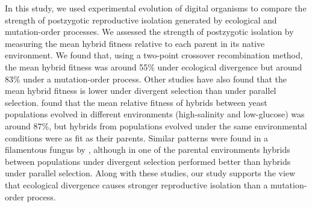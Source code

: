 \begin{doublespace}








In this study, we used experimental evolution of digital organisms
to compare the strength of postzygotic reproductive isolation
generated by ecological and mutation-order processes.
%
We assessed the strength of postzygotic isolation
by measuring the mean hybrid fitness relative to each parent
in its native environment.
%
We found that, using a two-point crossover recombination method,
the mean hybrid fitness was around 55\% under ecological divergence
but around 83\% under a mutation-order process.
%
Other studies have also found that the mean hybrid fitness
is lower under divergent selection than under parallel selection.
%
\citet{det07} found that the mean relative fitness of hybrids
between yeast populations evolved in different environments
(high-salinity and low-glucose) was around 87\%,
but hybrids from populations evolved
under the same environmental conditions were as fit as their parents.
%
Similar patterns were found in a filamentous fungus by \citet{det08},
although in one of the parental environments
hybrids between populations under divergent selection
performed better than hybrids under parallel selection.
%
Along with these studies, our study supports
the view that ecological divergence causes
stronger reproductive isolation than a mutation-order process.




\end{doublespace}
